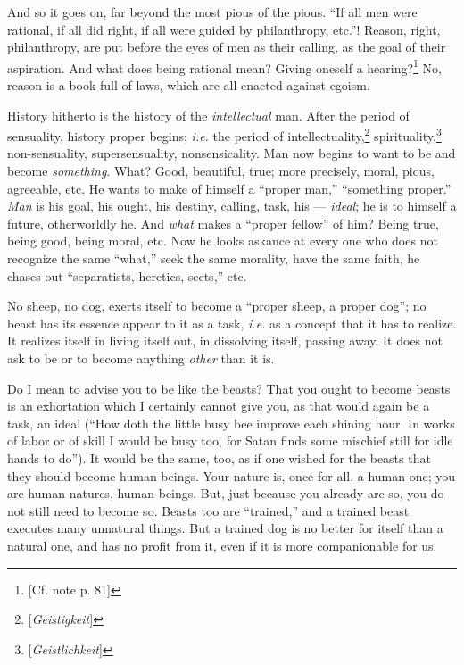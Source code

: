 And so it goes on, far beyond the most pious of the pious. ``If all men were 
rational, if all did right, if all were guided by philanthropy, etc.''! 
Reason, right, philanthropy, are put before the eyes of men as their calling, 
as the goal of their aspiration. And what does being rational mean? Giving 
oneself a hearing?\footnote{[Cf. note p. 81]} No, reason is a book full of 
laws, which are all enacted against egoism.

History hitherto is the history of the \textit{intellectual} man. After the 
period of sensuality, history proper begins; \textit{i.e.} the period of 
intellectuality,\footnote{[\textit{Geistigkeit}]} 
spirituality,\footnote{[\textit{Geistlichkeit}]} non-sensuality, 
supersensuality, nonsensicality. Man now begins to want to be and become 
\textit{something}. What? Good, beautiful, true; more precisely, moral, pious, 
agreeable, etc. He wants to make of himself a ``proper man,'' ``something 
proper.'' \textit{Man} is his goal, his ought, his destiny, calling, task, 
his --- \textit{ideal}; he is to himself a future, otherworldly he. And 
\textit{what} makes a ``proper fellow'' of him? Being true, being good, 
being moral, etc. Now he looks askance at every one who does not recognize the 
same ``what,'' seek the same morality, have the same faith, he chases out 
``separatists, heretics, sects,'' etc.

No sheep, no dog, exerts itself to become a ``proper sheep, a proper dog''; 
no beast has its essence appear to it as a task, \textit{i.e.} as a concept 
that it has to realize. It realizes itself in living itself out, in dissolving 
itself, passing away. It does not ask to be or to become anything 
\textit{other} than it is.

Do I mean to advise you to be like the beasts? That you ought to become beasts 
is an exhortation which I certainly cannot give you, as that would again be a 
task, an ideal (``How doth the little busy bee improve each shining hour. In 
works of labor or of skill I would be busy too, for Satan finds some mischief 
still for idle hands to do''). It would be the same, too, as if one wished 
for the beasts that they should become human beings. Your nature is, once for 
all, a human one; you are human natures, human beings. But, just because you 
already are so, you do not still need to become so. Beasts too are 
``trained,'' and a trained beast executes many unnatural things. But a 
trained dog is no better for itself than a natural one, and has no profit from 
it, even if it is more companionable for us.

